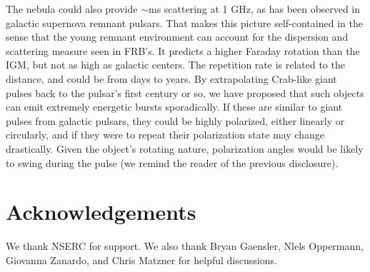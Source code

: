 \documentclass[useAMS,usenatbib]{mn2e}
\begin{document}
The nebula could also provide $\sim$ms scattering at 1 GHz, as has been 
observed in galactic supernova remnant pulsars. 
That makes this picture self-contained in the sense that
the young remnant environment can account for the dispersion 
and scattering measure seen in FRB's.  It predicts a higher Faraday
rotation than the IGM, but not as high as galactic centers.  The
repetition rate is related to the distance, and could be from days to
years.  
By extrapolating Crab-like giant pulses back to the pulsar's first century or so,
we have proposed that such objects can emit extremely energetic bursts sporadically. 
If these are similar to giant pulses from galactic pulsars, they could be highly polarized, 
either linearly or circularly, and if they were to repeat their polarization state may 
change drastically. Given the object's rotating nature, polarization
 angles would be likely to swing during the pulse (we
remind the reader of the previous disclosure).
\\




\section{Acknowledgements}

We thank NSERC for support. We also thank Bryan Gaensler, Nlels Oppermann, 
Giovanna Zanardo, and Chris Matzner for helpful discussions. 

\newcommand{\araa}{ARA\&A}   %
\newcommand{\afz}{Afz}       %
\newcommand{\aj}{AJ}         %
\newcommand{\azh}{AZh}       %
\newcommand{\aaa}{A\&A}      %
\newcommand{\aas}{A\&AS}     %
\newcommand{\aar}{A\&AR}     %
\newcommand{\apj}{ApJ}       %
\newcommand{\apjs}{ApJS}     %
\newcommand{\apjl}{ApJ}      %
\newcommand{\apss}{Ap\&SS}   %
\newcommand{\baas}{BAAS}     %
\newcommand{\jaa}{JA\&A}     %
\newcommand{\mnras}{MNRAS}   %
\newcommand{\nat}{Nat}       %
\newcommand{\pasj}{PASJ}     %
\newcommand{\pasp}{PASP}     %
\newcommand{\paspc}{PASPC}   %
\newcommand{\qjras}{QJRAS}   %
\newcommand{\sci}{Sci}       %
\newcommand{\solphys}{Solar Physics}       %
\newcommand{\sova}{SvA}      %
\newcommand{\aap}{A\&A}
\newcommand\jcap{{J. Cosmology Astropart. Phys.}}%
\newcommand{\prd}{Phys. Rev. D}

%




\label{lastpage}
\end{document}
